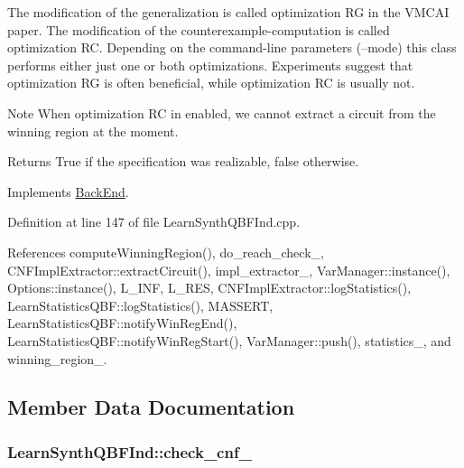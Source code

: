The modification of the generalization is called optimization R\-G in the V\-M\-C\-A\-I paper. The modification of the counterexample-\/computation is called optimization R\-C. Depending on the command-\/line parameters (--mode) this class performs either just one or both optimizations. Experiments suggest that optimization R\-G is often beneficial, while optimization R\-C is usually not.

\begin{DoxyNote}{Note}
When optimization R\-C in enabled, we cannot extract a circuit from the winning region at the moment. 
\end{DoxyNote}
\begin{DoxyReturn}{Returns}
True if the specification was realizable, false otherwise. 
\end{DoxyReturn}


Implements \hyperlink{classBackEnd_a099e717dc71e9cc2d838b1ca86340590}{Back\-End}.



Definition at line 147 of file Learn\-Synth\-Q\-B\-F\-Ind.\-cpp.



References compute\-Winning\-Region(), do\-\_\-reach\-\_\-check\-\_\-, C\-N\-F\-Impl\-Extractor\-::extract\-Circuit(), impl\-\_\-extractor\-\_\-, Var\-Manager\-::instance(), Options\-::instance(), L\-\_\-\-I\-N\-F, L\-\_\-\-R\-E\-S, C\-N\-F\-Impl\-Extractor\-::log\-Statistics(), Learn\-Statistics\-Q\-B\-F\-::log\-Statistics(), M\-A\-S\-S\-E\-R\-T, Learn\-Statistics\-Q\-B\-F\-::notify\-Win\-Reg\-End(), Learn\-Statistics\-Q\-B\-F\-::notify\-Win\-Reg\-Start(), Var\-Manager\-::push(), statistics\-\_\-, and winning\-\_\-region\-\_\-.



\subsection{Member Data Documentation}
\hypertarget{classLearnSynthQBFInd_ac90a4574da82c96888db219291368554}{
\subsubsection[{check\-\_\-cnf\-\_\-}]{ Learn\-Synth\-Q\-B\-F\-Ind\-::check\-\_\-cnf\-\_\-\hspace{0.3cm}{\ttfamily [protected]}}}\label{classLearnSynthQBFInd_ac90a4574da82c96888db219291368554}


